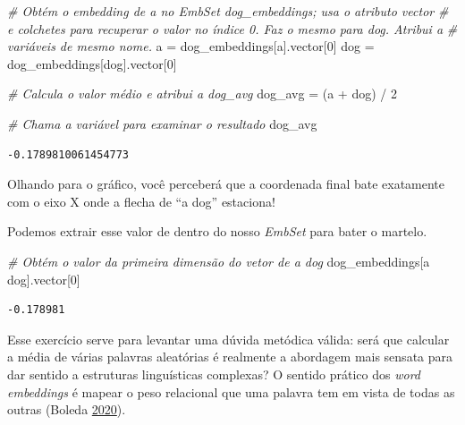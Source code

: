 \documentclass[
  brazilian,
]{article}
\newenvironment{Shaded}{}{}
\newcommand{\CommentTok}[1]{\textcolor[rgb]{0.38,0.63,0.69}{\textit{#1}}}
\newcommand{\DecValTok}[1]{\textcolor[rgb]{0.25,0.63,0.44}{#1}}
\newcommand{\NormalTok}[1]{#1}
\newcommand{\OperatorTok}[1]{\textcolor[rgb]{0.40,0.40,0.40}{#1}}
\newcommand{\StringTok}[1]{\textcolor[rgb]{0.25,0.44,0.63}{#1}}
\begin{document}
\begin{Shaded}
\begin{Highlighting}[]
\CommentTok{\# Obtém o embedding de \textquotesingle{}a\textquotesingle{} no EmbSet \textquotesingle{}dog\_embeddings\textquotesingle{}; usa o atributo vector}
\CommentTok{\# e colchetes para recuperar o valor no índice 0. Faz o mesmo para \textquotesingle{}dog\textquotesingle{}. Atribui a}
\CommentTok{\# variáveis de mesmo nome.}
\NormalTok{a }\OperatorTok{=}\NormalTok{ dog\_embeddings[}\StringTok{\textquotesingle{}a\textquotesingle{}}\NormalTok{].vector[}\DecValTok{0}\NormalTok{]}
\NormalTok{dog }\OperatorTok{=}\NormalTok{ dog\_embeddings[}\StringTok{\textquotesingle{}dog\textquotesingle{}}\NormalTok{].vector[}\DecValTok{0}\NormalTok{]}

\CommentTok{\# Calcula o valor médio e atribui a \textquotesingle{}dog\_avg\textquotesingle{}}
\NormalTok{dog\_avg }\OperatorTok{=}\NormalTok{ (a }\OperatorTok{+}\NormalTok{ dog) }\OperatorTok{/} \DecValTok{2}

\CommentTok{\# Chama a variável para examinar o resultado}
\NormalTok{dog\_avg}
\end{Highlighting}
\end{Shaded}

\begin{verbatim}
-0.1789810061454773
\end{verbatim}

Olhando para o gráfico, você perceberá que a coordenada final bate
exatamente com o eixo X onde a flecha de ``a dog'' estaciona!

Podemos extrair esse valor de dentro do nosso \emph{EmbSet} para bater o
martelo.

\begin{Shaded}
\begin{Highlighting}[]
\CommentTok{\# Obtém o valor da primeira dimensão do vetor de \textquotesingle{}a dog\textquotesingle{}}
\NormalTok{dog\_embeddings[}\StringTok{\textquotesingle{}a dog\textquotesingle{}}\NormalTok{].vector[}\DecValTok{0}\NormalTok{]}
\end{Highlighting}
\end{Shaded}

\begin{verbatim}
-0.178981
\end{verbatim}

Esse exercício serve para levantar uma dúvida metódica válida: será que
calcular a média de várias palavras aleatórias é realmente a abordagem
mais sensata para dar sentido a estruturas linguísticas complexas? O
sentido prático dos \emph{word embeddings} é mapear o peso relacional
que uma palavra tem em vista de todas as outras (Boleda
\href{https://doi.org/10.1146/annurev-linguistics-011619-030303}{2020}).
\end{document}
